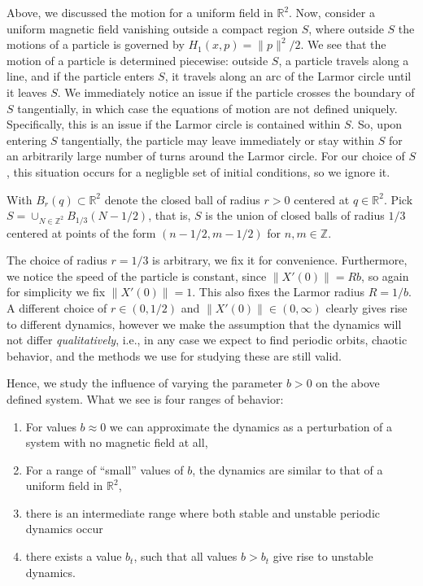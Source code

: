 Above, we discussed the motion for a uniform field in $\mathbb R^2$. Now, consider a uniform magnetic field vanishing outside a compact region $S$, where outside $S$ the motions of a particle is governed by $H_1(x,p)=\|p\|^2/2$. We see that the motion of a particle is determined piecewise: outside $S$, a particle travels along a line, and if the particle enters $S$, it travels along an arc of the Larmor circle until it leaves $S$. We immediately notice an issue if the particle crosses the boundary of $S$ tangentially, in which case the equations of motion are not defined uniquely. Specifically, this is an issue if the Larmor circle is contained within $S$. So, upon entering $S$ tangentially, the particle may leave immediately or stay within $S$ for an arbitrarily large number of turns around the Larmor circle. For our choice of $S$, this situation occurs for a negligble set of initial conditions, so we ignore it.


With $B_r(q)\subset \mathbb R^2$ denote the closed ball of radius $r>0$ centered at $q\in\mathbb R^2$. Pick $S=\cup_{N\in\mathbb Z^2}B_{1/3}(N-1/2)$, that is, $S$ is the union of closed balls of radius $1/3$ centered at points of the form $(n-1/2,m-1/2)$ for $n,m\in\mathbb Z$.

The choice of radius $r=1/3$ is arbitrary, we fix it for convenience. Furthermore, we notice the speed of the particle is constant, since $\|X'(0)\|=Rb$, so again for simplicity we fix $\|X'(0)\|=1$. This also fixes the Larmor radius $R=1/b$. A different choice of $r\in (0,1/2)$ and $\|X'(0)\|\in(0,\infty)$ clearly gives rise to different dynamics, however we make the assumption that the dynamics will not differ \textit{qualitatively}, i.e., in any case we expect to find periodic orbits, chaotic behavior, and the methods we use for studying these are still valid.

Hence, we study the influence of varying the parameter $b>0$ on the above defined system. What we see is four ranges of behavior:
\begin{enumerate}
\item For values $b\approx0$ we can approximate the dynamics as a perturbation of a system with no magnetic field at all,
\item For a range of ``small'' values of $b$, the dynamics are similar to that of a uniform field in $\mathbb R^2$,
\item there is an intermediate range where both stable and unstable periodic dynamics occur
\item there exists a value $b_t$, such that all values $b>b_t$ give rise to unstable dynamics.
\end{enumerate}

